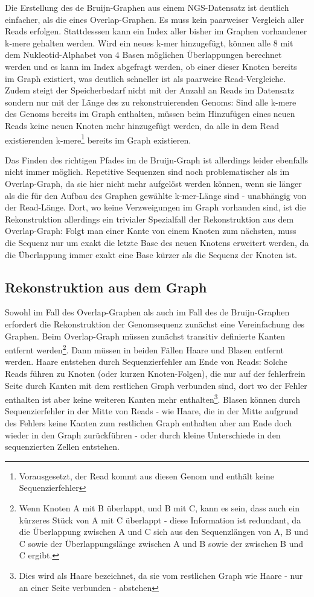 Die Erstellung des de Bruijn-Graphen aus einem NGS-Datensatz ist deutlich einfacher, als die eines Overlap-Graphen. Es muss kein paarweiser Vergleich aller Reads erfolgen. Stattdesssen kann ein Index aller bisher im Graphen vorhandener k-mere gehalten werden. Wird ein neues k-mer hinzugefügt, können alle 8 mit dem Nukleotid-Alphabet von 4 Basen möglichen Überlappungen berechnet werden und es kann im Index abgefragt werden, ob einer dieser Knoten bereits im Graph existiert, was deutlich schneller ist als paarweise Read-Vergleiche. Zudem steigt der Speicherbedarf nicht mit der Anzahl an Reads im Datensatz sondern nur mit der Länge des zu rekonstruierenden Genoms: Sind alle k-mere des Genoms bereits im Graph enthalten, müssen beim Hinzufügen eines neuen Reads keine neuen Knoten mehr hinzugefügt werden, da alle in dem Read existierenden k-mere\footnote{Vorausgesetzt, der Read kommt aus diesen Genom und enthält keine Sequenzierfehler} bereits im Graph existieren. 

Das Finden des richtigen Pfades im de Bruijn-Graph ist allerdings leider ebenfalls nicht immer möglich. Repetitive Sequenzen sind noch problematischer als im Overlap-Graph, da sie hier nicht mehr aufgelöst werden können, wenn sie länger als die für den Aufbau des Graphen gewählte k-mer-Länge sind - unabhängig von der Read-Länge. Dort, wo keine Verzweigungen im Graph vorhanden sind, ist die Rekonstruktion allerdings ein trivialer Spezialfall der Rekonstruktion aus dem Overlap-Graph: Folgt man einer Kante von einem Knoten zum nächsten, muss die Sequenz nur um exakt die letzte Base des neuen Knotens erweitert werden, da die Überlappung immer exakt eine Base kürzer als die Sequenz der Knoten ist.

\subsection{Rekonstruktion aus dem Graph}

Sowohl im Fall des Overlap-Graphen als auch im Fall des de Bruijn-Graphen erfordert die Rekonstruktion der Genomsequenz zunächst eine Vereinfachung des Graphen. Beim Overlap-Graph müssen zunächst transitiv definierte Kanten entfernt werden\footnote{Wenn Knoten A mit B überlappt, und B mit C, kann es sein, dass auch ein kürzeres Stück von A mit C überlappt - diese Information ist redundant, da die Überlappung zwischen A und C sich aus den Sequenzlängen von A, B und C sowie der Überlappungslänge zwischen A und B sowie der zwischen B und C ergibt.}. Dann müssen in beiden Fällen Haare und Blasen entfernt werden. Haare entstehen durch Sequenzierfehler am Ende von Reads: Solche Reads führen zu Knoten (oder kurzen Knoten-Folgen), die nur auf der fehlerfrein Seite durch Kanten mit dem restlichen Graph verbunden sind, dort wo der Fehler enthalten ist aber keine weiteren Kanten mehr enthalten\footnote{Dies wird als Haare bezeichnet, da sie vom restlichen Graph wie Haare - nur an einer Seite verbunden - abstehen}. Blasen können durch Sequenzierfehler in der Mitte von Reads - wie Haare, die in der Mitte aufgrund des Fehlers keine Kanten zum restlichen Graph enthalten aber am Ende doch wieder in den Graph zurückführen - oder durch kleine Unterschiede in den sequenzierten Zellen entstehen.

